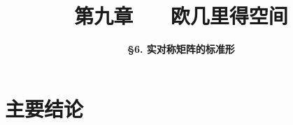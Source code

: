 



\title[{\bfseries 欧几里得空间}\\\vspace{1em}实对称矩阵的标准形]{\LARGE \bfseries 第九章 ~~ 欧几里得空间} %
\author[] %
{\Large \bfseries \S 6. 实对称矩阵的标准形}
\date{}






\begin{frame}

\titlepage %

\end{frame}





\section{主要结论}

